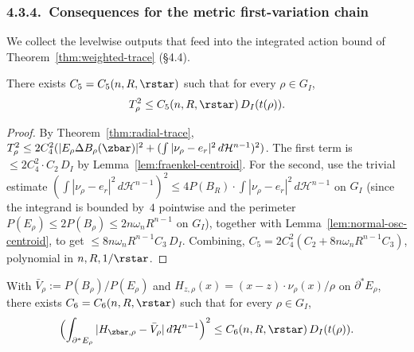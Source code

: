 \subsubsection{4.3.4.\ Consequences for the metric first-variation chain}
\label{ssec:fj-output}

We collect the levelwise outputs that feed into the integrated action
bound of Theorem~\ref{thm:weighted-trace} (\S4.4).

\begin{corollary}\label{cor:T-pointwise}
There exists $C_5=C_5(n,R,\rstar)$ such that for every $\rho\in G_I$,
\begin{equation}\label{eq:T-pointwise}
   T_\rho^2
   \le C_5(n,R,\rstar)\,D_I(t(\rho)).
\end{equation}
\end{corollary}

\begin{proof}
By Theorem~\ref{thm:radial-trace},
$T_\rho^2\le 2C_4^2(|E_\rho\Delta B_\rho(\zbar)|^2
+(\int|\nu_\rho-e_r|^2\,d\mathcal H^{n-1})^2)$. The first term is
$\le 2C_4^2\cdot C_2\,D_I$ by Lemma~\ref{lem:fraenkel-centroid}. For the
second, use the trivial estimate
$(\int|\nu_\rho-e_r|^2\,d\mathcal H^{n-1})^2\le 4P(B_R)\cdot\int|\nu_\rho-e_r|^2\,d\mathcal H^{n-1}$
on $G_I$ (since the integrand is bounded by~$4$ pointwise and the
perimeter $P(E_\rho)\le 2P(B_\rho)\le 2n\omega_n R^{n-1}$ on $G_I$),
together with Lemma~\ref{lem:normal-osc-centroid}, to get
$\le 8n\omega_n R^{n-1}C_3\,D_I$. Combining,
$C_5=2C_4^2(C_2+8n\omega_n R^{n-1}C_3)$, polynomial in $n,R,1/\rstar$.
\end{proof}

\begin{corollary}
\label{cor:H-trace-good}
With $\bar V_\rho:=P(B_\rho)/P(E_\rho)$ and
$H_{z,\rho}(x)=(x-z)\cdot\nu_\rho(x)/\rho$ on $\partial^*E_\rho$, there
exists $C_6=C_6(n,R,\rstar)$ such that for every $\rho\in G_I$,
\begin{equation}\label{eq:H-trace-good}
   \Bigl(\int_{\partial^*E_\rho}|H_{\zbar,\rho}-\bar V_\rho|\,
       d\mathcal H^{n-1}\Bigr)^2
   \le C_6(n,R,\rstar)\,D_I(t(\rho)).
\end{equation}
\end{corollary}

